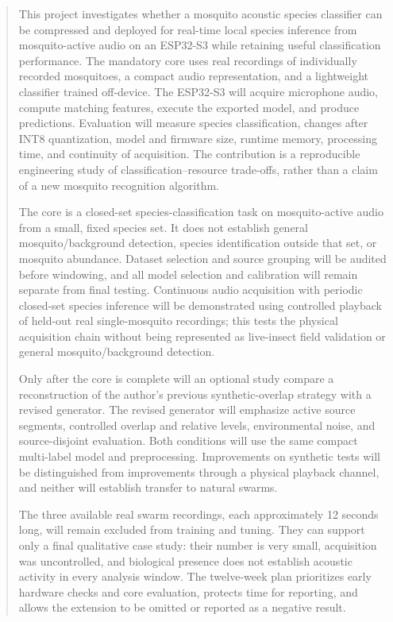 \documentclass[a4paper,11pt]{article}
\begin{document}
\begin{abstract}
This project investigates whether a mosquito acoustic species classifier can be compressed and deployed for real-time local species inference from mosquito-active audio on an ESP32-S3 while retaining useful classification performance. The mandatory core uses real recordings of individually recorded mosquitoes, a compact audio representation, and a lightweight classifier trained off-device. The ESP32-S3 will acquire microphone audio, compute matching features, execute the exported model, and produce predictions. Evaluation will measure species classification, changes after INT8 quantization, model and firmware size, runtime memory, processing time, and continuity of acquisition. The contribution is a reproducible engineering study of classification--resource trade-offs, rather than a claim of a new mosquito recognition algorithm.

The core is a closed-set species-classification task on mosquito-active audio from a small, fixed species set. It does not establish general mosquito/background detection, species identification outside that set, or mosquito abundance. Dataset selection and source grouping will be audited before windowing, and all model selection and calibration will remain separate from final testing. Continuous audio acquisition with periodic closed-set species inference will be demonstrated using controlled playback of held-out real single-mosquito recordings; this tests the physical acquisition chain without being represented as live-insect field validation or general mosquito/background detection.

Only after the core is complete will an optional study compare a reconstruction of the author's previous synthetic-overlap strategy with a revised generator. The revised generator will emphasize active source segments, controlled overlap and relative levels, environmental noise, and source-disjoint evaluation. Both conditions will use the same compact multi-label model and preprocessing. Improvements on synthetic tests will be distinguished from improvements through a physical playback channel, and neither will establish transfer to natural swarms.

The three available real swarm recordings, each approximately 12 seconds long, will remain excluded from training and tuning. They can support only a final qualitative case study: their number is very small, acquisition was uncontrolled, and biological presence does not establish acoustic activity in every analysis window. The twelve-week plan prioritizes early hardware checks and core evaluation, protects time for reporting, and allows the extension to be omitted or reported as a negative result.
\end{abstract}
\vspace{0.3cm}
\tableofcontents
\clearpage
{}
\end{document}
